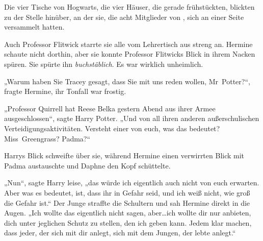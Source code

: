 Die vier Tische von Hogwarts, die vier Häuser, die gerade frühstückten, blickten zu der Stelle hinüber, an der sie, die acht Mitglieder von \SPHEW, sich an einer Seite versammelt hatten.

Auch Professor Flitwick starrte sie alle vom Lehrertisch aus streng an. Hermine schaute nicht dorthin, aber sie konnte Professor Flitwicks Blick in ihrem Nacken spüren. Sie spürte ihn \emph{buchstäblich}. Es war wirklich unheimlich.

„Warum haben Sie Tracey gesagt, dass Sie mit uns reden wollen, Mr~Potter?“, fragte Hermine, ihr Tonfall war frostig.

„Professor Quirrell hat Reese Belka gestern Abend aus ihrer Armee ausgeschlossen“, sagte Harry Potter. „Und von all ihren anderen außerschulischen Verteidigungsaktivitäten. Versteht einer von euch, was das bedeutet? Miss~Greengrass? Padma?“

Harrys Blick schweifte über sie, während Hermine einen verwirrten Blick mit Padma austauschte und Daphne den Kopf schüttelte.

„Nun“, sagte Harry leise, „das würde ich eigentlich auch nicht von euch erwarten. Aber was es bedeutet, ist, dass ihr in Gefahr seid, und ich weiß nicht, wie groß die Gefahr ist.“ Der Junge straffte die Schultern und sah Hermine direkt in die Augen. „Ich wollte das eigentlich nicht sagen, aber…ich wollte dir nur anbieten, dich unter jeglichen Schutz zu stellen, den ich geben kann. Jedem klar machen, dass jeder, der sich mit dir anlegt, sich mit dem Jungen, der lebte anlegt.“

